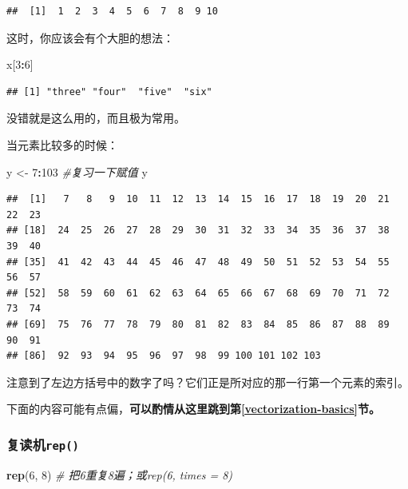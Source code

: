 \documentclass[]{book}
\newenvironment{Shaded}{\begin{snugshade}}{\end{snugshade}}
\newcommand{\CommentTok}[1]{\textcolor[rgb]{0.56,0.35,0.01}{\textit{#1}}}
\newcommand{\DecValTok}[1]{\textcolor[rgb]{0.00,0.00,0.81}{#1}}
\newcommand{\KeywordTok}[1]{\textcolor[rgb]{0.13,0.29,0.53}{\textbf{#1}}}
\newcommand{\NormalTok}[1]{#1}
\newcommand{\OperatorTok}[1]{\textcolor[rgb]{0.81,0.36,0.00}{\textbf{#1}}}
\newcommand{\StringTok}[1]{\textcolor[rgb]{0.31,0.60,0.02}{#1}}
\begin{document}
\begin{verbatim}
##  [1]  1  2  3  4  5  6  7  8  9 10
\end{verbatim}

这时，你应该会有个大胆的想法：

\begin{Shaded}
\begin{Highlighting}[]
\NormalTok{x[}\DecValTok{3}\OperatorTok{:}\DecValTok{6}\NormalTok{]}
\end{Highlighting}
\end{Shaded}

\begin{verbatim}
## [1] "three" "four"  "five"  "six"
\end{verbatim}

没错就是这么用的，而且极为常用。

当元素比较多的时候：

\begin{Shaded}
\begin{Highlighting}[]
\NormalTok{y <-}\StringTok{ }\DecValTok{7}\OperatorTok{:}\DecValTok{103} \CommentTok{#复习一下赋值}
\NormalTok{y}
\end{Highlighting}
\end{Shaded}

\begin{verbatim}
##  [1]   7   8   9  10  11  12  13  14  15  16  17  18  19  20  21  22  23
## [18]  24  25  26  27  28  29  30  31  32  33  34  35  36  37  38  39  40
## [35]  41  42  43  44  45  46  47  48  49  50  51  52  53  54  55  56  57
## [52]  58  59  60  61  62  63  64  65  66  67  68  69  70  71  72  73  74
## [69]  75  76  77  78  79  80  81  82  83  84  85  86  87  88  89  90  91
## [86]  92  93  94  95  96  97  98  99 100 101 102 103
\end{verbatim}

注意到了左边方括号中的数字了吗？它们正是所对应的那一行第一个元素的索引。

下面的内容可能有点偏，\textbf{可以酌情从这里跳到第\ref{vectorization-basics}节。}

\hypertarget{rep}{%
\subsubsection{\texorpdfstring{复读机\texttt{rep()}}{复读机rep()}}\label{rep}}

\begin{Shaded}
\begin{Highlighting}[]
\KeywordTok{rep}\NormalTok{(}\DecValTok{6}\NormalTok{, }\DecValTok{8}\NormalTok{) }\CommentTok{# 把6重复8遍；或rep(6, times = 8)}
\end{Highlighting}
\end{Shaded}
\end{document}
